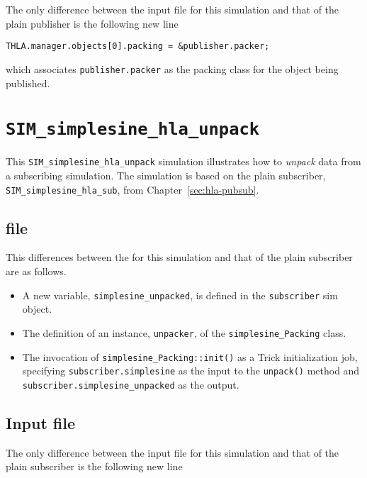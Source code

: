 The only difference between the input file for this simulation and
that of the plain publisher is the following new line

\begin{verbatim}
THLA.manager.objects[0].packing = &publisher.packer; \end{verbatim}

which associates {\tt publisher.packer} as the packing class for
the object being published.

\section{\tt SIM\_simplesine\_hla\_unpack}

This {\tt SIM\_simplesine\_hla\_unpack} simulation illustrates how to
{\em unpack} data from a subscribing simulation.
The simulation is based on the plain subscriber,
{\tt SIM\_simplesine\_hla\_sub}, from
Chapter~\ref{sec:hla-pubsub}.

\subsection{\sdefine file}
This differences between the \sdefine for this simulation and that
of the plain subscriber are as follows.

\begin{itemize}
\item{
  A new \simplesine variable, {\tt simplesine\_unpacked},
  is defined in the {\tt subscriber} sim object.
}
\item{
  The definition of an instance, {\tt unpacker},
  of the {\tt simplesine\_Packing} class.
}
\item{
  The invocation of {\tt simplesine\_Packing::init()} as a Trick
  initialization job,
  specifying {\tt subscriber.simplesine} as the input to the {\tt unpack()}
  method and {\tt subscriber.simple\-sine\_\-un\-packed} as the output.
}
\end{itemize}

\subsection{Input file}

The only difference between the input file for this simulation and
that of the plain subscriber is the following new line


